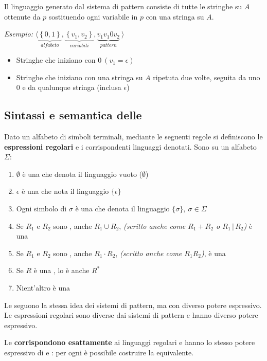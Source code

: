 \documentclass[italian, 10pt]{article}
\begin{document}
Il linguaggio generato dal sistema di pattern consiste di tutte le stringhe su \(A\) ottenute da \(p\) sostituendo ogni variabile in \(p\) con una stringa su \(A\).

\bigskip
\textit{Esempio:} \(\langle \underbrace{\left\{0, 1\right\}}_{alfabeto}, \underbrace{\left\{v_1, v_2\right\}}_{variabili}, \underbrace{v_1 v_1 0 v_2}_{pattern} \ \rangle\)
\begin{itemize}
  \item Stringhe che iniziano con \(0 \ (v_1 = \epsilon)\)
  \item Stringhe che iniziano con una stringa su \(A\) ripetuta due volte, seguita da uno \(0\) e da qualunque stringa (inclusa \(\epsilon\))
\end{itemize}

\subsection{Sintassi e semantica delle \RE}

Dato un alfabeto di simboli terminali, mediante le seguenti regole si definiscono le \textbf{espressioni regolari} e i corrispondenti linguaggi denotati.
Sono \RE su un alfabeto \(\Sigma\):

\begin{enumerate}
  \item \(\emptyset\) è una \RE che denota il linguaggio vuoto (\(\emptyset\))
  \item \(\epsilon\) è una \RE che nota il linguaggio \(\{\epsilon\}\)
  \item Ogni simbolo di \(\sigma\) è una \RE che denota il linguaggio \(\{\sigma\}, \ \sigma \in \Sigma\)
  \item Se \(R_1\) e \(R_2\) sono \RE, anche \(R_1 \cup R_2\), \textit{(scritto anche come \(R_1 + R_2\) o \(R_1 \, | \, R_2\))} è una \RE
  \item Se \(R_1\) e \(R_2\) sono \RE, anche \(R_1 \cdot R_2\), \textit{(scritto anche come \(R_1 R_2\))}, è una \RE
  \item Se \(R\) è una \RE, lo è anche \(R^\ast\)
  \item Nient'altro è una \RE
\end{enumerate}

Le \RE seguono la stessa idea dei sistemi di pattern, ma con diverso potere espressivo.
Le espressioni regolari sono diverse dai sistemi di pattern e hanno diverso potere espressivo.

Le \RE \textbf{corrispondono esattamente} ai linguaggi regolari e hanno lo stesso potere espressivo di \RG e \FSA: per ogni \FSA è possibile costruire la \RE equivalente.
\end{document}
